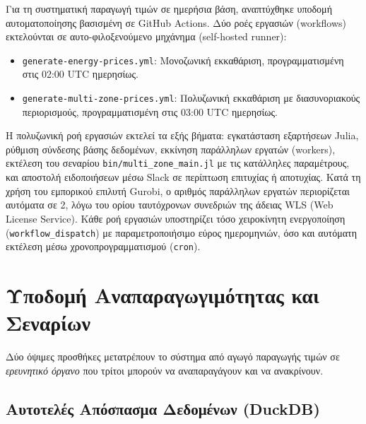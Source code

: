 Για τη συστηματική παραγωγή τιμών σε ημερήσια βάση, αναπτύχθηκε υποδομή αυτοματοποίησης βασισμένη σε GitHub Actions. Δύο ροές εργασιών (workflows) εκτελούνται σε αυτο-φιλοξενούμενο μηχάνημα (self-hosted runner):

\begin{itemize}
\item \texttt{generate-energy-prices.yml}: Μονοζωνική εκκαθάριση, προγραμματισμένη στις 02:00 UTC ημερησίως.
\item \texttt{generate-multi-zone-prices.yml}: Πολυζωνική εκκαθάριση με διασυνοριακούς περιορισμούς, προγραμματισμένη στις 03:00 UTC ημερησίως.
\end{itemize}

Η πολυζωνική ροή εργασιών εκτελεί τα εξής βήματα: εγκατάσταση εξαρτήσεων Julia, ρύθμιση σύνδεσης βάσης δεδομένων, εκκίνηση παράλληλων εργατών (workers), εκτέλεση του σεναρίου \texttt{bin/multi\_zone\_main.jl} με τις κατάλληλες παραμέτρους, και αποστολή ειδοποιήσεων μέσω Slack σε περίπτωση επιτυχίας ή αποτυχίας. Κατά τη χρήση του εμπορικού επιλυτή Gurobi, ο αριθμός παράλληλων εργατών περιορίζεται αυτόματα σε 2, λόγω του ορίου ταυτόχρονων συνεδριών της άδειας WLS (Web License Service). Κάθε ροή εργασιών υποστηρίζει τόσο χειροκίνητη ενεργοποίηση (\texttt{workflow\_dispatch}) με παραμετροποιήσιμο εύρος ημερομηνιών, όσο και αυτόματη εκτέλεση μέσω χρονοπρογραμματισμού (\texttt{cron}).


\section{Υποδομή Αναπαραγωγιμότητας και Σεναρίων}
\label{sec:scenario-infra}

Δύο όψιμες προσθήκες μετατρέπουν το σύστημα από αγωγό παραγωγής τιμών σε \emph{ερευνητικό όργανο} που τρίτοι μπορούν να αναπαραγάγουν και να ανακρίνουν.

\subsection{Αυτοτελές Απόσπασμα Δεδομένων (DuckDB)}
\label{subsec:duckdb-extract}

